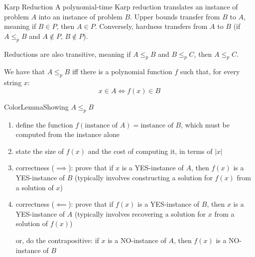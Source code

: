 \documentclass[a4paper, 11pt]{report}
\begin{document}
\begin{defframe}{Karp Reduction}{}
    A polynomial-time Karp reduction translates an instance of problem $A$ into an instance of problem $B$. Upper bounds transfer from $B$ to $A$, meaning if $B \in P$, then $A \in P$. Conversely, hardness transfers from $A$ to $B$ (if $A \leq_{p} B $ and $A \not\in P$, $B \not\in P$). 

    Reductions are also transitive, meaning if $A \leq_{p}B $ and $B \leq_{p} C$, then $A \leq_{p} C$.

We have that $A \leq_{p} B$ iff there is a polynomial function $f$ such that, for every string $x$:
$$x \in A \iff f(x) \in B$$
\end{defframe}

\begin{cframe}{ColorLemma}{Showing $A \leq_{p} B$}
    \begin{enumerate}
        \item define the function $f(\text{instance of } A) = \text{instance of } B$, which must be computed from the instance alone
        \item state the size of $f(x)$ and the cost of computing it, in terms of $|x|$
        \item correctness ($\implies $): prove that if $x$ is a YES-instance of $A$, then $f(x)$ is a YES-instance of $B$ (typically involves constructing a solution for $f(x)$ from a solution of $x$)
        \item correctness ($\impliedby $): prove that if $f(x)$ is a YES-instance of $B$, then $x$ is a YES-instance of $A$ (typically involves recovering a solution for $x$ from a solution of $f(x)$)
            
            or, do the contrapositive: if $x$ is a NO-instance of $A$, then $f(x)$ is a NO-instance of $B$
    \end{enumerate}
\end{cframe}
\end{document}
